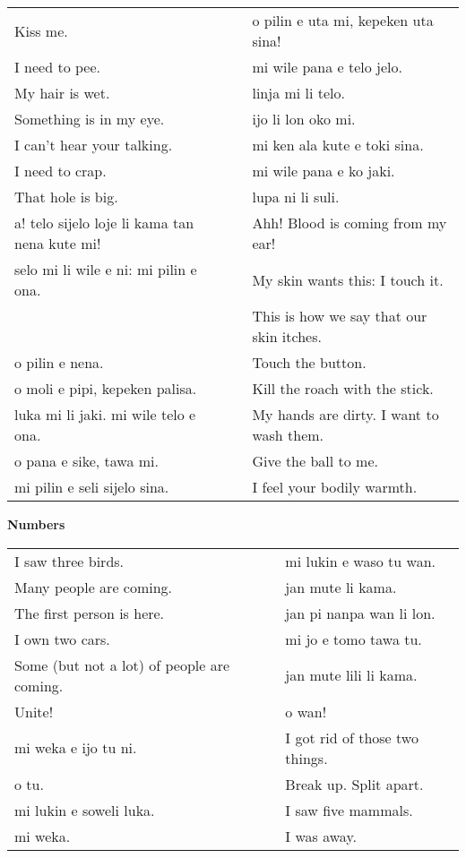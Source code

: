 \begin{supertabular}{p{5,5cm}|ll}
Kiss me.  && o pilin e uta mi, kepeken uta sina! \\ %
I need to pee.  && mi wile pana e telo jelo. \\ %
My hair is wet.  && linja mi li telo. \\ %
Something is in my eye.  && ijo li lon oko mi. \\ %
I can't hear your talking.  && mi ken ala kute e toki sina. \\ %
I need to crap.  && mi wile pana e ko jaki. \\ %
That hole is big.  && lupa ni li suli. \\ %
a! telo sijelo loje li kama tan nena kute mi!  && Ahh! Blood is coming from my ear! \\
selo mi li wile e ni: mi pilin e ona.  && My skin wants this: I touch it. \\
   && This is how we say that our skin itches. \\  %
o pilin e nena.  && Touch the button. \\
o moli e pipi, kepeken palisa.  && Kill the roach with the stick. \\
luka mi li jaki. mi wile telo e ona.  && My hands are dirty. I want to wash them. \\
o pana e sike, tawa mi.  && Give the ball to me. \\
mi pilin e seli sijelo sina.  && I feel your bodily warmth. \\
\end{supertabular} 
%
\newpage
\textbf{Numbers} 
\label{'numbers'}

\begin{supertabular}{p{5,5cm}|ll}
I saw three birds.  && mi lukin e waso tu wan. \\ %
Many people are coming.  && jan mute li kama. \\ %
The first person is here.  && jan pi nanpa wan li lon. \\ %
I own two cars.  && mi jo e tomo tawa tu. \\ %
Some (but not a lot) of people are coming.  && jan mute lili li kama. \\ %
Unite!  && o wan! \\ %
mi weka e ijo tu ni.  && I got rid of those two things. \\
o tu.  && Break up. Split apart. \\
mi lukin e soweli luka.  && I saw five mammals. \\
mi weka.  && I was away. \\
\end{supertabular} 

